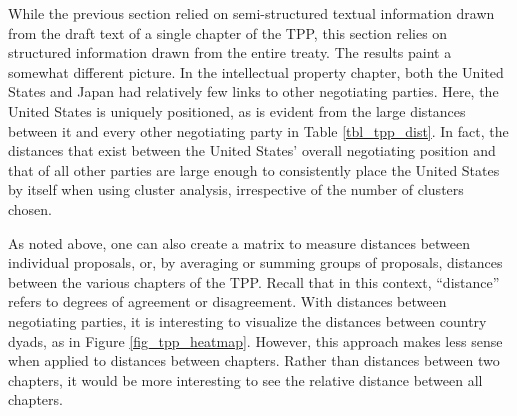 \documentclass[12pt]{article}
\begin{document}
% 

While the previous section relied on semi-structured textual information 
drawn from the draft text of a single chapter of the TPP, this section relies on structured information 
drawn from the entire treaty. The results paint a somewhat different picture. In the intellectual 
property chapter, both the United States and Japan had relatively few links to other negotiating 
parties. Here, the United States is uniquely positioned, as is evident from the large distances 
between it and every other negotiating party in Table \ref{tbl_tpp_dist}. 
In fact, the distances that exist between the United States' overall negotiating position 
and that of all other parties are large enough to consistently place the United States by itself when 
using cluster analysis, irrespective of the number of clusters chosen.

As noted above, one can also create a matrix to measure distances between 
individual proposals, or, by averaging or summing groups of proposals, distances 
between the various chapters of the TPP. Recall that in this context, ``distance'' refers to 
degrees of agreement or disagreement. With distances between negotiating parties, it is interesting 
to visualize the distances between country dyads, as in Figure \ref{fig_tpp_heatmap}. 
However, this approach makes less sense when applied to distances 
between chapters. Rather than distances between two chapters, it would be more interesting to see 
the relative distance between all chapters.
\end{document}
